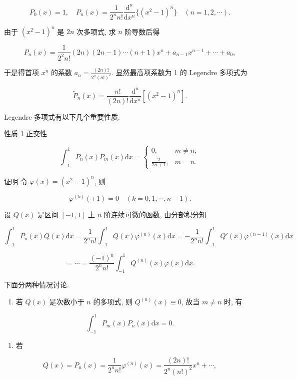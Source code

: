 \documentclass[
  10pt,
  fontset=fandol]{ctexart}
\providecommand{\tightlist}{%
  \setlength{\itemsep}{0pt}\setlength{\parskip}{0pt}}
\begin{document}
\[
P_0(x) = 1, \quad P_n(x) = \frac{1}{2^n n!} \frac{\mathrm{d}^n}{\mathrm{d}x^n} \{(x^2 - 1)^n\} \quad (n = 1, 2, \cdots). \tag{3.4.1}
\]

由于 \((x^2 - 1)^n\) 是 \(2n\) 次多项式, 求 \(n\) 阶导数后得

\[
P_n(x) = \frac{1}{2^2 n!} (2n)(2n - 1) \cdots (n + 1)x^n + a_{n-1}x^{n-1} + \cdots + a_0,
\]

于是得首项 \(x^n\) 的系数 \(a_n = \frac{(2n)!}{2^n (n!)^2}\). 显然最高项系数为 1 的 Legendre 多项式为

\[
\tilde{P}_n(x) = \frac{n!}{(2n)!} \frac{\mathrm{d}^n}{\mathrm{d}x^n} [(x^2 - 1)^n]. \tag{3.4.2}
\]

Legendre 多项式有以下几个重要性质.

性质 1 正交性

\[
\int_{-1}^{1} P_n(x) P_m(x) \mathrm{d}x = \begin{cases} 0, & m \neq n, \\ \frac{2}{2n + 1}, & m = n. \end{cases} \tag{3.4.3}
\]

证明 令 \(\varphi(x) = (x^2 - 1)^n\), 则

\[
\varphi^{(k)}(\pm 1) = 0 \quad (k = 0, 1, \cdots, n - 1).
\]

设 \(Q(x)\) 是区间 \([-1, 1]\) 上 \(n\) 阶连续可微的函数, 由分部积分知

\[
\int_{-1}^{1} P_n(x) Q(x) \mathrm{d}x = \frac{1}{2^n n!} \int_{-1}^{1} Q(x) \varphi^{(n)}(x) \mathrm{d}x = -\frac{1}{2^n n!} \int_{-1}^{1} Q'(x) \varphi^{(n-1)}(x) \mathrm{d}x
\]

\[
= \cdots = \frac{(-1)^n}{2^n n!} \int_{-1}^{1} Q^{(n)}(x) \varphi(x) \mathrm{d}x.
\]

下面分两种情况讨论.

\begin{enumerate}
\def\labelenumi{(\arabic{enumi})}
\tightlist
\item
  若 \(Q(x)\) 是次数小于 \(n\) 的多项式, 则 \(Q^{(n)}(x) \equiv 0\), 故当 \(m \neq n\) 时, 有
\end{enumerate}

\[
\int_{-1}^{1} P_m(x) P_n(x) \mathrm{d}x = 0.
\]

\begin{enumerate}
\def\labelenumi{(\arabic{enumi})}
\setcounter{enumi}{1}
\tightlist
\item
  若
\end{enumerate}

\[
Q(x) = P_n(x) = \frac{1}{2^n n!} \varphi^{(n)}(x) = \frac{(2n)!}{2^n (n!)^2} x^n + \cdots,
\]
\end{document}
